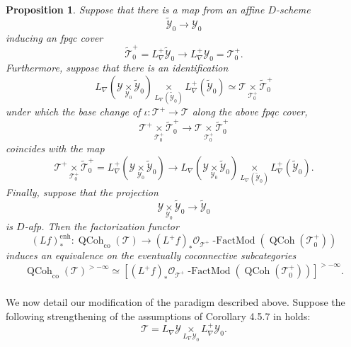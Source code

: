 \documentclass[10pt]{amsart}
\newtheorem{prop}[subsubsection]{Proposition}
\theoremstyle{remark}
\newcommand{\on}[1]{\operatorname{#1}}
\newcommand{\QCoh}{\on{QCoh}}
\newcommand{\sssec}[1]{\subsubsection{}}
\begin{document}
\begin{prop} \label{alg approximation} \cite{GLC2}
    Suppose that there is a map from an affine $D$-scheme
    $$
    \tilde{\mathcal{Y}}_0 \to \mathcal{Y}_0
    $$
    inducing an fpqc cover
    $$
    \tilde{\mathcal{T}}_0^+ = L_{\nabla}^+\tilde{\mathcal{Y}}_0 \to L_{\nabla}^+ \mathcal{Y}_0 = \mathcal{T}_0^+.
    $$
    Furthermore, suppose that there is an identification
    $$
    L_{\nabla}(\mathcal{Y} \underset{\mathcal{Y}_0}{\times} \tilde{\mathcal{Y}}_0) \underset{L_{\nabla}(\tilde{\mathcal{Y}}_0)}{\times} L_{\nabla}^+(\tilde{\mathcal{Y}}_0) \simeq \mathcal{T} \underset{\mathcal{T}_0^+}{\times} \tilde{\mathcal{T}}_0^+
    $$
    under which the base change of $\iota : \mathcal{T}^+ \to \mathcal{T}$ along the above fpqc cover,
    $$
    \mathcal{T}^+ \underset{\mathcal{T}_0^+}{\times} \tilde{\mathcal{T}}_0^+ \to \mathcal{T} \underset{\mathcal{T}_0^+}{\times} \tilde{\mathcal{T}}_0^+
    $$
    coincides with the map
    $$
    \mathcal{T}^+ \underset{\mathcal{T}_0^+}{\times} \tilde{\mathcal{T}}_0^+ = L_{\nabla}^+(\mathcal{Y} \underset{\mathcal{Y_0}}{\times} \tilde{\mathcal{Y}}_0) \to L_{\nabla}(\mathcal{Y} \underset{\mathcal{Y_0}}{\times} \tilde{\mathcal{Y}}_0) \underset{L_{\nabla}(\tilde{\mathcal{Y}}_0)}{\times} L_{\nabla}^+(\tilde{\mathcal{Y}}_0).
    $$
    Finally, suppose that the projection 
    $$
    \mathcal{Y} \underset{\mathcal{Y_0}}{\times} \tilde{\mathcal{Y}}_0 \to \tilde{\mathcal{Y}}_0
    $$
    is $D$-afp.
    Then the factorization functor
    $$
    (Lf)_*^{\on{enh}} : \QCoh_{\on{co}}(\mathcal{T}) \to (L^+f)_*\mathcal{O}_{\mathcal{T}^+}\on{-FactMod} (\QCoh(\mathcal{T}_0^+))
    $$
    induces an equivalence on the eventually coconnective subcategories
    $$
    \QCoh_{\on{co}}(\mathcal{T})^{>-\infty} \simeq [(L^+f)_*\mathcal{O}_{\mathcal{T}^+}\on{-FactMod} (\QCoh(\mathcal{T}_0^+))]^{>-\infty}.
    $$
\end{prop}

\sssec{}
We now detail our modification of the paradigm described above. Suppose the following strengthening of the assumptions of Corollary 4.5.7 in \cite{GLC2} holds:
$$
\mathcal{T} = L_{\nabla}\mathcal{Y} \underset{L_{\nabla}\mathcal{Y}_0}{\times} L_{\nabla}^+\mathcal{Y}_0.
$$
\end{document}
